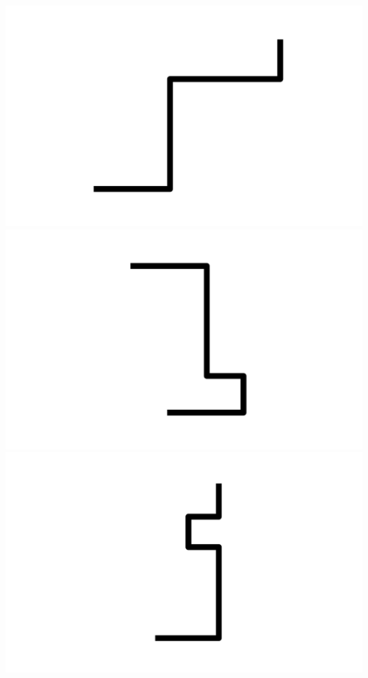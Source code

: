 \documentclass[]{report}
\begin{document}
\includegraphics[scale=.1]{pictures/21/state_cluster_shapes_187.pdf} 
\includegraphics[scale=.1]{pictures/21/state_cluster_shapes_188.pdf} 
\includegraphics[scale=.1]{pictures/21/state_cluster_shapes_189.pdf} 
\end{document}

